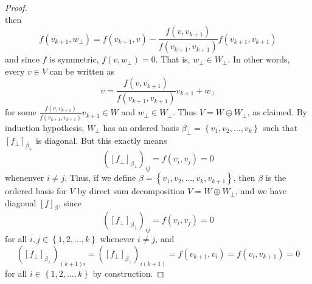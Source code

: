 \documentclass[math_245.tex]{subfiles}
\begin{document}
\begin{proof}
\begin{equation*}
        \end{equation*}
        then
        \begin{equation*}
            f\left( v_{k+1}, w_\perp \right) = f\left( v_{k+1}, v \right) - \frac{f\left( v, v_{k+1} \right) }{f\left( v_{k+1},v_{k+1} \right) }f\left( v_{k+1},v_{k+1} \right) 
        \end{equation*}
        and since $f$ is symmetric, $f\left( v, w_\perp \right) = 0$. That is, $w_\perp\in W_\perp$. In other words, every $v\in V$ can be written as
        \begin{equation*}
            v = \frac{f\left( v, v_{k+1} \right) }{f\left( v_{k+1},v_{k+1} \right) }v_{k+1} + w_\perp
        \end{equation*}
        for some $\frac{f\left( v, v_{k+1} \right) }{f\left( v_{k+1},v_{k+1} \right) }v_{k+1}\in W$ and $w_\perp\in W_\perp$. Thus $V=W\oplus W_\perp$, as claimed. By induction hypothesis, $W_\perp$ has an ordered basis $\beta_\perp = \left\lbrace v_1,v_2,\ldots,v_k \right\rbrace $ such that $\left[ f_\perp \right] _{\beta_\perp}$ is diagonal. But this exactly means
        \begin{equation*}
            \left( \left[ f_\perp \right] _{\beta_\perp} \right) _{ij} = f\left( v_i,v_j \right) = 0
        \end{equation*}
        whenenver $i\neq j$. Thus, if we define $\beta = \left\lbrace v_1,v_2,\ldots,v_k,v_{k+1} \right\rbrace$, then $\beta$ is the ordered basis for $V$ by direct sum decomposition $V = W\oplus W_\perp$, and we have diagonal $\left[ f \right] _\beta$, since
        \begin{equation*}
            \left( \left[ f_\perp \right] _{\beta_\perp} \right) _{ij} = f\left( v_i,v_j \right) = 0
        \end{equation*}
        for all $i,j\in \left\lbrace 1,2,\ldots,k \right\rbrace$ whenever $i\neq j$, and 
        \begin{equation*}
            \left( \left[ f_\perp \right] _{\beta_\perp} \right) _{(k+1)i} = \left( \left[ f_\perp \right] _{\beta_\perp} \right) _{i(k+1)} = f\left( v_{k+1}, v_i \right) = f\left( v_i, v_{k+1} \right) = 0
        \end{equation*}
        for all $i\in \left\lbrace 1,2,\ldots,k \right\rbrace$ by construction.
    \end{proof}





    
\end{document}
